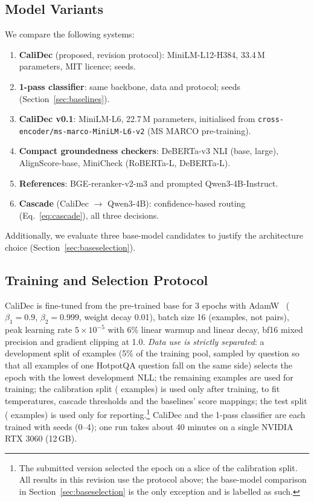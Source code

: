 \documentclass[twocolumn]{ICCKjournal}
\begin{document}
\subsection{Model Variants}
We compare the following systems:
\begin{enumerate}[leftmargin=*]
    \item \textbf{CaliDec} (proposed, revision protocol): MiniLM-L12-H384, 33.4\,M parameters, MIT licence; \NSeeds{} seeds.
    \item \textbf{1-pass classifier}: same backbone, data and protocol; \NSeeds{} seeds (Section~\ref{sec:baselines}).
    \item \textbf{CaliDec v0.1}: MiniLM-L6, 22.7\,M parameters, initialised from \texttt{cross-encoder/ms-marco-MiniLM-L6-v2} (MS MARCO pre-training).
    \item \textbf{Compact groundedness checkers}: DeBERTa-v3 NLI (base, large), AlignScore-base, MiniCheck (RoBERTa-L, DeBERTa-L).
    \item \textbf{References}: BGE-reranker-v2-m3 and prompted Qwen3-4B-Instruct.
    \item \textbf{Cascade} (CaliDec $\to$ Qwen3-4B): confidence-based routing (Eq.~\ref{eq:cascade}), all three decisions.
\end{enumerate}

Additionally, we evaluate three base-model candidates to justify the architecture choice (Section~\ref{sec:baseselection}).

\subsection{Training and Selection Protocol}
\label{sec:protocol}
CaliDec is fine-tuned from the pre-trained base for 3 epochs with AdamW~\cite{loshchilov2019decoupled} ($\beta_1=0.9$, $\beta_2=0.999$, weight decay 0.01), batch size 16 (examples, not pairs), peak learning rate $5 \times 10^{-5}$ with 6\% linear warmup and linear decay, bf16 mixed precision and gradient clipping at 1.0. \emph{Data use is strictly separated}: a development split of \NDev{} examples (5\% of the training pool, sampled by question so that all examples of one HotpotQA question fall on the same side) selects the epoch with the lowest development NLL; the remaining \NTrain{} examples are used for training; the calibration split (\NCalib{} examples) is used only after training, to fit temperatures, cascade thresholds and the baselines' score mappings; the test split (\NTest{} examples) is used only for reporting.\footnote{The submitted version selected the epoch on a slice of the calibration split. All results in this revision use the protocol above; the base-model comparison in Section~\ref{sec:baseselection} is the only exception and is labelled as such.} CaliDec and the 1-pass classifier are each trained with \NSeeds{} seeds (0--4); one run takes about 40 minutes on a single NVIDIA RTX 3060 (12\,GB).
\end{document}
